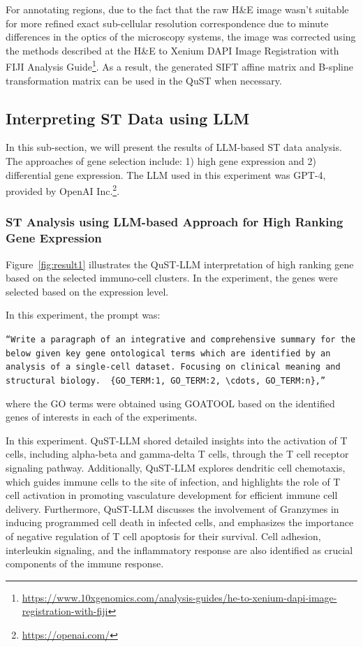\documentclass{article}
\begin{document}
For annotating regions, due to the fact that the raw H\&E image wasn't suitable for more refined exact sub-cellular resolution correspondence due to minute differences in the optics of the microscopy systems, the image was corrected using the methods described at the H\&E to Xenium DAPI Image Registration with FIJI Analysis Guide\footnote{\url{https://www.10xgenomics.com/analysis-guides/he-to-xenium-dapi-image-registration-with-fiji}}. As a result, the generated SIFT affine matrix and B-spline transformation matrix can be used in the QuST when necessary.

\subsection{Interpreting ST Data using LLM}

In this sub-section, we will present the results of LLM-based ST data analysis. The approaches of gene selection include: 1) high gene expression and 2) differential gene expression. The LLM used in this experiment was GPT-4, provided by OpenAI Inc.\footnote{\url{https://openai.com/}}. 

\subsubsection{ST Analysis using LLM-based Approach for High Ranking Gene Expression}
\label{sec:llm4heg}

Figure~\ref{fig:result1} illustrates the QuST-LLM interpretation of high ranking gene based on the selected immuno-cell clusters. In the experiment, the genes were selected based on the expression level. 

In this experiment, the prompt was:
\begin{center}
	\parbox{0.9\textwidth}{
		\texttt{``Write a paragraph of an integrative and comprehensive summary for the below given key gene ontological terms which are identified by an analysis of a single-cell dataset. Focusing on clinical meaning and structural biology. \\\\\{GO\_TERM:$1$, GO\_TERM:$2$, $\cdots$, GO\_TERM:$n$\},''}}
\end{center}
where the GO terms were obtained using GOATOOL based on the identified genes of interests in each of the experiments.

In this experiment. QuST-LLM shored detailed insights into the activation of T cells, including alpha-beta and gamma-delta T cells, through the T cell receptor signaling pathway. Additionally, QuST-LLM explores dendritic cell chemotaxis, which guides immune cells to the site of infection, and highlights the role of T cell activation in promoting vasculature development for efficient immune cell delivery. Furthermore, QuST-LLM discusses the involvement of Granzymes in inducing programmed cell death in infected cells, and emphasizes the importance of negative regulation of T cell apoptosis for their survival. Cell adhesion, interleukin signaling, and the inflammatory response are also identified as crucial components of the immune response.
\end{document}
